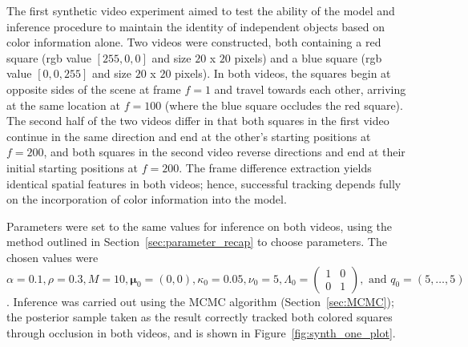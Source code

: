 \documentclass[twocolumn, final]{svjour3}
\begin{document}
The first synthetic video experiment aimed to test the ability of the model and inference procedure to maintain the identity of independent objects based on color information alone. Two videos were constructed, both containing a red square (rgb value $[255,0,0]$ and size $20$ x $20$ pixels) and a blue square (rgb value $[0,0,255]$ and size $20$ x $20$ pixels). In both videos, the squares begin at opposite sides of the scene at frame $f=1$ and travel towards each other, arriving at the same location at $f=100$ (where the blue square occludes the red square). The second half of the two videos differ in that both squares in the first video continue in the same direction and end at the other's starting positions at $f=200$, and both squares in the second video reverse directions and end at their initial starting positions at $f=200$. The frame difference extraction yields identical spatial features in both videos; hence, successful tracking depends fully on the incorporation of color information into the model.

Parameters were set to the same values for inference on both videos, using the method outlined in Section~\ref{sec:parameter_recap} to choose parameters. The chosen values were $\alpha = 0.1, \rho = 0.3, M = 10, \boldsymbol{\mu}_{0} = (0,0), \kappa_{0} = 0.05, \nu_{0} = 5, \Lambda_{0} = \left( \begin{smallmatrix} 1&0\\ 0&1 \end{smallmatrix} \right), \text{ and } q_{0} = (5, \ldots, 5)$. Inference was carried out using the MCMC algorithm (Section~\ref{sec:MCMC}); the posterior sample taken as the result correctly tracked both colored squares through occlusion in both videos, and is shown in Figure~\ref{fig:synth_one_plot}. 

\end{document}
